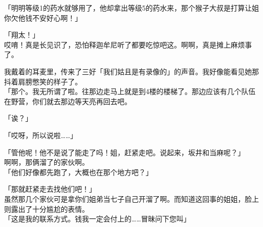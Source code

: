 「明明等级1的药水就够用了，他却拿出等级5的药水来，那个猴子大叔是打算让姐你欠他钱不安好心啊！」

「翔太！」\\

哎唷！真是长见识了，恐怕释迦牟尼听了都要吃惊吧这。啊啊，真是摊上麻烦事了。

我戴着的耳麦里，传来了三好「我们姑且是有录像的」的声音。我好像能看见她那抖着肩膀憋笑的样子了。\\

「那个。我无所谓了啦。往那边走马上就是到4楼的楼梯了。那边应该有几个队伍在野营，你们就去那边等天亮再回去吧。

「诶？」

「哎呀，所以说啦……」

「管他呢！他不是说了能走了吗！姐，赶紧走吧。说起来，坂井和当麻呢？」\\

啊啊，那俩溜了的家伙啊。\\

「他们好像都先跑了，大概也在那个地方吧？」

「那就赶紧走去找他们吧！」\\

虽然那几个家伙可是拿你们姐弟当七子自己开溜了啊。而知道这回事的姐姐，脸上则露出了十分尴尬的表情。\\

「这是我的联系方式。钱我一定会付上的……冒昧问下您叫」

